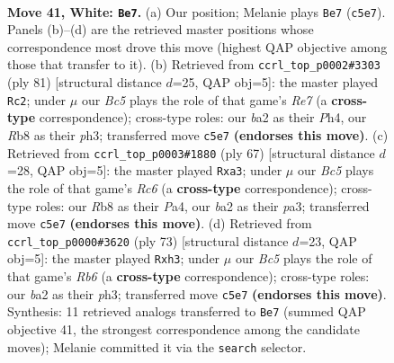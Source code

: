 \documentclass[11pt]{article}
\begin{document}
\clearpage

\begin{figure}[p]\centering
\begin{subfigure}{0.46\textwidth}\centering
\resizebox{\linewidth}{!}{%
\newchessgame
\chessboard[
  setfen={1R6/8/B6k/2B1p3/4r2p/5p1P/b4P1K/8 w - - 10 41},
  showmover=false,
  pgfstyle=straightmove, color=movearrow, markmove={c5-e7}
]}
\caption{}
\end{subfigure}\hfill
\begin{subfigure}{0.46\textwidth}\centering
\resizebox{\linewidth}{!}{%
\newchessgame
\chessboard[
  setfen={8/8/5kp1/2R5/2P2PPp/4p2P/4r3/6K1 b - - 0 41},
  showmover=false,
  pgfstyle=straightmove, color=movearrow, markmove={e2-c2}
]}
\caption{}
\end{subfigure}
\\[4pt]
\begin{subfigure}{0.46\textwidth}\centering
\resizebox{\linewidth}{!}{%
\newchessgame
\chessboard[
  setfen={8/6pk/4R3/3pP2P/p7/P1r5/5P1P/5K2 b - - 0 34},
  showmover=false,
  pgfstyle=straightmove, color=movearrow, markmove={c3-a3}
]}
\caption{}
\end{subfigure}\hfill
\begin{subfigure}{0.46\textwidth}\centering
\resizebox{\linewidth}{!}{%
\newchessgame
\chessboard[
  setfen={8/6pk/5p2/R4P1P/P7/1r5P/5K2/8 b - - 0 37},
  showmover=false,
  pgfstyle=straightmove, color=movearrow, markmove={b3-h3}
]}
\caption{}
\end{subfigure}
\caption{\textbf{Move 41, White: \texttt{Be7}.} (a) Our position; Melanie plays \texttt{Be7} (\texttt{c5e7}). Panels (b)--(d) are the retrieved master positions whose correspondence most drove this move (highest QAP objective among those that transfer to it). (b) Retrieved from \texttt{ccrl\_top\_p0002\#3303} (ply 81) [structural distance $d$=25, QAP obj=5]: the master played \texttt{Rc2}; under $\mu$ our \emph{Bc5} plays the role of that game's \emph{Re7} (a \textbf{cross-type} correspondence); cross-type roles: our \emph{b}a2 as their \emph{P}h4, our \emph{R}b8 as their \emph{p}h3; transferred move \texttt{c5e7} \textbf{(endorses this move)}. (c) Retrieved from \texttt{ccrl\_top\_p0003\#1880} (ply 67) [structural distance $d$=28, QAP obj=5]: the master played \texttt{Rxa3}; under $\mu$ our \emph{Bc5} plays the role of that game's \emph{Rc6} (a \textbf{cross-type} correspondence); cross-type roles: our \emph{R}b8 as their \emph{P}a4, our \emph{b}a2 as their \emph{p}a3; transferred move \texttt{c5e7} \textbf{(endorses this move)}. (d) Retrieved from \texttt{ccrl\_top\_p0000\#3620} (ply 73) [structural distance $d$=23, QAP obj=5]: the master played \texttt{Rxh3}; under $\mu$ our \emph{Bc5} plays the role of that game's \emph{Rb6} (a \textbf{cross-type} correspondence); cross-type roles: our \emph{b}a2 as their \emph{p}h3; transferred move \texttt{c5e7} \textbf{(endorses this move)}. Synthesis: 11 retrieved analogs transferred to \texttt{Be7} (summed QAP objective 41, the strongest correspondence among the candidate moves); Melanie committed it via the \texttt{search} selector.}
\label{fig:thought-m80}
\end{figure}
\end{document}
